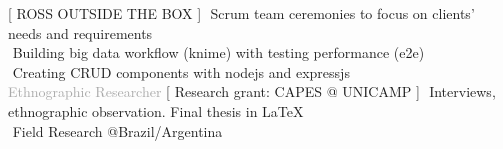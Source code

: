 \begin{cvtable}
%
	{[ R{\scriptsize OSS} O{\scriptsize UTSIDE THE} B{\scriptsize OX} ]}{
        \textperiodcentered $ $ Scrum team ceremonies to focus on clients' needs and requirements \\        
        \textperiodcentered $ $ Building big data workflow (knime) with testing performance (e2e) \\        
        \textperiodcentered $ $ Creating CRUD components with nodejs and expressjs \\
        }  
% 
	{%
	\textcolor{darkgray}{%
    Ethnographic Researcher
	}}
	{
    [ 
    Research grant:
    {C\scriptsize APES} @ {\scriptsize UNICAMP}
    ]%
	}
	{
        \textperiodcentered $ $ Interviews, ethnographic observation. Final thesis in \LaTeX \\
        \textperiodcentered $ $ 
        Field Research @Brazil/Argentina
        \\ 
	\wt{%
}}
\end{cvtable}
